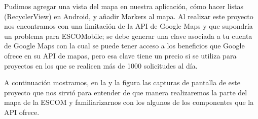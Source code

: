 \noindent
Pudimos agregar una vista del mapa en nuestra aplicación, cómo hacer listas (RecyclerView) en Android, y añadir Markers al mapa. Al realizar este proyecto nos encontramos con una limitación de la API de Google Maps y que supondría un problema para ESCOMobile; se debe generar una clave asociada a tu cuenta de Google Maps con la cual se puede tener acceso a los beneficios que Google ofrece en su API de mapas, pero esa clave tiene un precio si se utiliza para proyectos en los que se realicen más de 1000 solicitudes al día.

\noindent
A continuación mostramos, en la  y la figura  las capturas de pantalla de este proyecto que nos sirvió para entender de que manera realizaremos la parte del mapa de la ESCOM y familiarizarnos con los algunos de los componentes que la API ofrece.




\newpage
